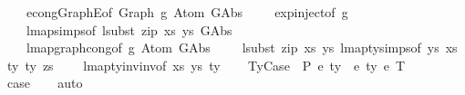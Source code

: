 \begin{isabellebody}
\ \ \ \ econg{\isacharunderscore}{\kern0pt}GraphE{\isacharbrackleft}{\kern0pt}of\ {\isachardoublequoteopen}Graph\ g{\isachardoublequoteclose}\ {\isachardoublequoteopen}Atom\ {\isacharparenleft}{\kern0pt}GAbs\ {\isacharunderscore}{\kern0pt}\ {\isacharunderscore}{\kern0pt}\ {\isacharunderscore}{\kern0pt}{\isacharparenright}{\kern0pt}\ {\isacharunderscore}{\kern0pt}{\isachardoublequoteclose}{\isacharbrackright}{\kern0pt}\ exp{\isachardot}{\kern0pt}inject{\isacharparenleft}{\kern0pt}{}{\isacharparenright}{\kern0pt}{\isacharbrackleft}{\kern0pt}of\ g{\isacharbrackright}{\kern0pt}\isanewline
\ \ \ \ lmap{\isachardot}{\kern0pt}simps{\isacharparenleft}{\kern0pt}{}{\isacharparenright}{\kern0pt}{\isacharbrackleft}{\kern0pt}of\ {\isachardoublequoteopen}lsubst\ {\isacharparenleft}{\kern0pt}zip\ xs\ ys{\isacharparenright}{\kern0pt}{\isachardoublequoteclose}\ {\isachardoublequoteopen}GAbs\ {\isacharunderscore}{\kern0pt}\ {\isacharunderscore}{\kern0pt}\ {\isacharunderscore}{\kern0pt}{\isachardoublequoteclose}{\isacharbrackright}{\kern0pt}\isanewline
\ \ \ \ lmap{\isacharunderscore}{\kern0pt}graph{\isacharunderscore}{\kern0pt}cong{\isacharbrackleft}{\kern0pt}of\ g\ {\isachardoublequoteopen}Atom\ {\isacharparenleft}{\kern0pt}GAbs\ {\isacharunderscore}{\kern0pt}\ {\isacharunderscore}{\kern0pt}\ {\isacharunderscore}{\kern0pt}{\isacharparenright}{\kern0pt}\ {\isacharunderscore}{\kern0pt}{\isachardoublequoteclose}\ {\isachardoublequoteopen}lsubst\ {\isacharparenleft}{\kern0pt}zip\ xs\ ys{\isacharparenright}{\kern0pt}{\isachardoublequoteclose}{\isacharbrackright}{\kern0pt}\ lmap{\isacharunderscore}{\kern0pt}ty{\isachardot}{\kern0pt}simps{\isacharparenleft}{\kern0pt}{}{\isacharparenright}{\kern0pt}{\isacharbrackleft}{\kern0pt}of\ ys\ xs\ ty{}\ ty{}\ zs{\isacharbrackright}{\kern0pt}\isanewline
\ \ \ \ lmap{\isacharunderscore}{\kern0pt}ty{\isacharunderscore}{\kern0pt}inv{\isacharunderscore}{\kern0pt}inv{\isacharbrackleft}{\kern0pt}of\ xs\ ys\ ty{\isacharbrackright}{\kern0pt}{\isacharparenright}{\kern0pt}\isanewline
{}\isamarkupfalse%
\isanewline
\ \ \isamarkupfalse%
\ {\isacharparenleft}{\kern0pt}TyCase\ {\isasymGamma}\ P\ e{}\ ty{}\ {\isasymGamma}{}\ e{}\ ty{}\ e{}\ T{\isacharparenright}{\kern0pt}\isanewline
\ \ \isamarkupfalse%
\ \isamarkupfalse%
\ {\isacharquery}{\kern0pt}case\isanewline
\ \ \isamarkupfalse%
\ auto\isanewline
\ \ \isamarkupfalse%

\end{isabellebody}
